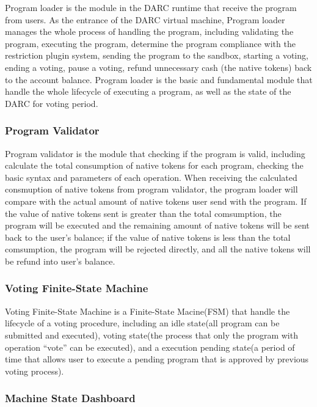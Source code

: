 \documentclass[main.tex]{subfiles}
\begin{document}
Program loader is the module in the DARC runtime that receive the program from users. As the entrance of the DARC virtual machine, Program loader manages the whole process of handling the program, including validating the program, executing the program, determine the program compliance with the restriction plugin system, sending the program to the sandbox, starting a voting, ending a voting, pause a voting, refund unnecessary cash (the native tokens) back to the account balance. Program loader is the basic and fundamental module that handle the whole lifecycle of executing a program, as well as the state of the DARC for voting period.

\subsubsection{Program Validator}

Program validator is the module that checking if the program is valid, including calculate the total consumption of native tokens for each program, checking the basic syntax and parameters of each operation. When receiving the calculated consmuption of native tokens from program validator, the program loader will compare with the actual amount of native tokens user send with the program. If the value of native tokens sent is greater than the total comsumption, the program will be executed and the remaining amount of native tokens will be sent back to the user's balance; if the value of native tokens is less than the total comsumption, the program will be rejected directly, and all the native tokens will be refund into user's balance.

\subsubsection{Voting Finite-State Machine}

Voting Finite-State Machine is a Finite-State Macine(FSM) that handle the lifecycle of a voting procedure, including an idle state(all program can be submitted and executed), voting state(the process that only the program with operation ``vote'' can be executed), and a execution pending state(a period of time that allows user to execute a pending program that is approved by previous voting process). 

\subsubsection{Machine State Dashboard}
\end{document}
